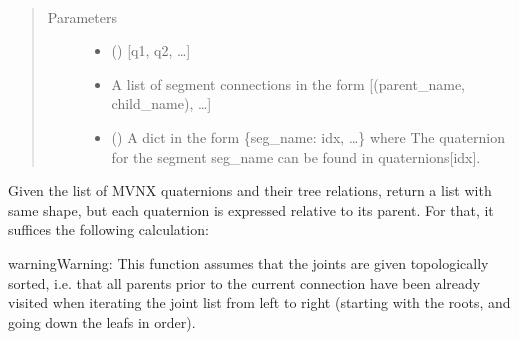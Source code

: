 \documentclass[letterpaper,10pt,english,openany,oneside]{sphinxmanual}
\begin{document}
\begin{fulllineitems}
\label{\detokenize{io_anim_mvnx:io_anim_mvnx.mvnx_import.global_to_inherited_quats}}~\begin{quote}\begin{description}
\item[{Parameters}] \leavevmode\begin{itemize}
\item {} 
 () \textendash{} {[}q1, q2, …{]}

\item {} 
 \textendash{} A list of segment connections in the form
{[}(parent\_name, child\_name), …{]}

\item {} 
 () \textendash{} A dict in the form \{seg\_name: idx, …\} where
The quaternion for the segment seg\_name can be found in quaternions{[}idx{]}.

\end{itemize}

\end{description}\end{quote}

Given the list of MVNX quaternions and their tree relations,
return a list with same shape, but each quaternion is expressed relative
to its parent. For that, it suffices the following calculation:

\begin{sphinxVerbatim}[commandchars=\\\{\}]
    
\end{sphinxVerbatim}

\begin{sphinxadmonition}{warning}{Warning:}
This function assumes that the joints are given topologically sorted,
i.e. that all parents prior to the current connection have been already
visited when iterating the joint list from left to right (starting with
the roots, and going down the leafs in order).
\end{sphinxadmonition}

\end{fulllineitems}
\end{document}
